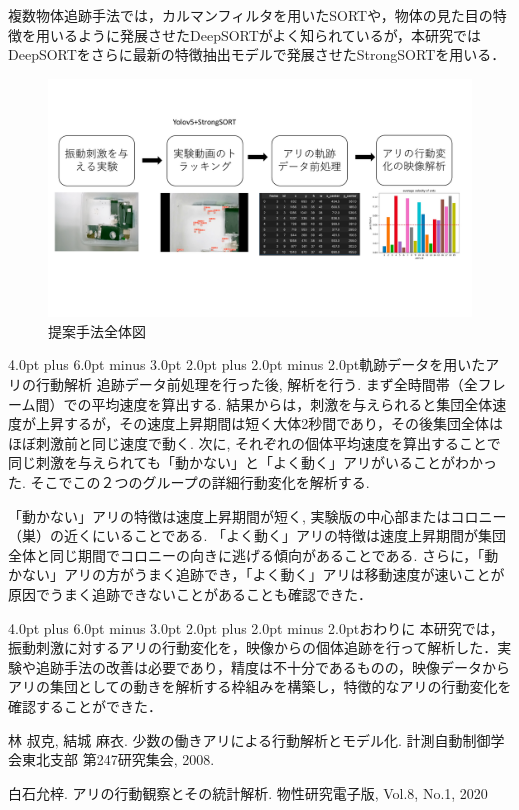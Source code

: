 \documentclass[a4paper,twocolumn,11pt]{jarticle}
\makeatletter
\renewcommand{\section}{\@startsection {section}{1}{\z@}%
{4.0pt plus 6.0pt minus 3.0pt}%
{2.0pt plus 2.0pt minus 2.0pt}{\large\bf }}
\makeatother
\begin{document}
複数物体追跡手法では，カルマンフィルタを用いたSORTや，物体の見た目の特徴を用いるように発展させたDeepSORTがよく知られているが，本研究ではDeepSORTをさらに最新の特徴抽出モデルで発展させたStrongSORTを用いる．

\begin{figure}[tbp]
\centering
\includegraphics[width=\linewidth]{nagare.pdf}
\caption[Short figure caption for List of Figures]{提案手法全体図}
\label{fig:paper1_fig1}
\end{figure}

\section{軌跡データを用いたアリの行動解析}
追跡データ前処理を行った後,  解析を行う. まず全時間帯（全フレーム間）での平均速度を算出する. 結果からは，刺激を与えられると集団全体速度が上昇するが，その速度上昇期間は短く大体2秒間であり，その後集団全体はほぼ刺激前と同じ速度で動く. 次に, それぞれの個体平均速度を算出することで同じ刺激を与えられても「動かない」と「よく動く」アリがいることがわかった. そこでこの２つのグループの詳細行動変化を解析する. 

「動かない」アリの特徴は速度上昇期間が短く, 実験版の中心部またはコロニー（巣）の近くにいることである. 「よく動く」アリの特徴は速度上昇期間が集団全体と同じ期間でコロニーの向きに逃げる傾向があることである. さらに，「動かない」アリの方がうまく追跡でき，「よく動く」アリは移動速度が速いことが原因でうまく追跡できないことがあることも確認できた．

\section{おわりに}
本研究では，振動刺激に対するアリの行動変化を，映像からの個体追跡を行って解析した．実験や追跡手法の改善は必要であり，精度は不十分であるものの，映像データからアリの集団としての動きを解析する枠組みを構築し，特徴的なアリの行動変化を確認することができた．

{ 
\small
\begin{thebibliography}{99}

林 叔克, 結城 麻衣. 少数の働きアリによる行動解析とモデル化. 計測自動制御学会東北支部 第247研究集会, 2008.

白石允梓. アリの行動観察とその統計解析. 物性研究電子版, Vol.8, No.1, 2020



\end{thebibliography}
}
\end{document}

